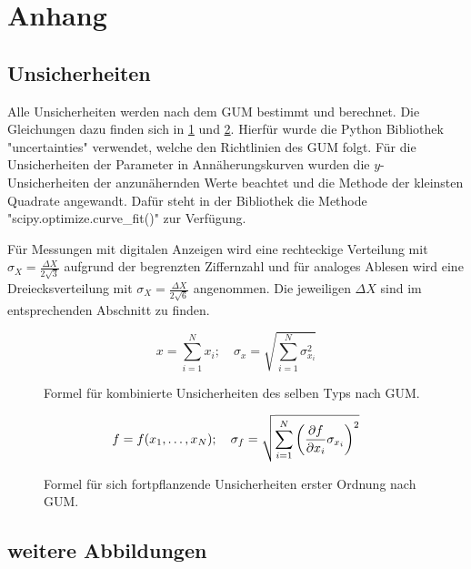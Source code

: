 \newpage
\appendix
\section{Anhang}\label{sec:anhang}

\subsection{Unsicherheiten}\label{sec:unsicherheiten}

Alle Unsicherheiten werden nach dem GUM bestimmt und berechnet.
Die Gleichungen dazu finden sich in \ref{fig:GUM_combine} und \ref{fig:GUM_formula}.
Hierfür wurde die Python Bibliothek "uncertainties" verwendet, welche den Richtlinien des GUM folgt.
Für die Unsicherheiten der Parameter in Annäherungskurven wurden die $y$-Unsicherheiten der anzunähernden Werte beachtet und die Methode der kleinsten Quadrate angewandt.
Dafür steht in der Bibliothek die Methode "scipy.optimize.curve\_fit()" zur Verfügung.

Für Messungen mit digitalen Anzeigen wird eine rechteckige Verteilung mit $\sigma_X = \frac{\Delta X}{2\sqrt{3}}$ aufgrund der begrenzten Ziffernzahl und für analoges Ablesen wird eine Dreiecksverteilung mit $\sigma_X = \frac{\Delta X}{2\sqrt{6}}$ angenommen.
Die jeweiligen $\Delta X$ sind im entsprechenden Abschnitt zu finden.

\begin{figure}[ht]
	\begin{equation*}
	x = \sum_{i=1}^{N} x_i
	;\quad
	\sigma_x = \sqrt{\sum_{i = 1}^{N} \sigma_{x_i}^2}
	\end{equation*}
	\caption{Formel für kombinierte Unsicherheiten des selben Typs nach GUM.}
	\label{fig:GUM_combine}
\end{figure}

\begin{figure}[ht]
	\begin{align*}
	f = f(x_1, \dots , x_N)
	;\quad
	\sigma_f = \sqrt{\sum_{i = 1}^{N}\left(\pdv{f}{x_i} \sigma_{x_i}\right) ^2}
	\end{align*}
	\caption{Formel für sich fortpflanzende Unsicherheiten erster Ordnung nach GUM.}
	\label{fig:GUM_formula}
\end{figure}

\newpage
\subsection{weitere Abbildungen}

